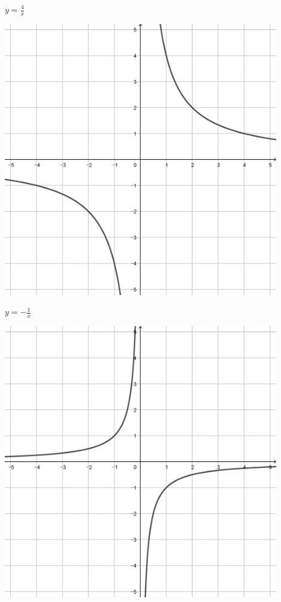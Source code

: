 \documentclass[a4paper]{oblivoir}
\begin{document}
\begin{minipage}{0.45\textwidth}\centering
\(y=\frac4x\)
\par\bigskip\includegraphics[width=0.9\textwidth]{img/4_rational_3}
\end{minipage}
\begin{minipage}{0.45\textwidth}\centering
\(y=-\frac1{x}\)
\par\bigskip\includegraphics[width=0.9\textwidth]{img/4_rational_4}
\end{minipage}\bigskip\bigskip\par
\end{document}
